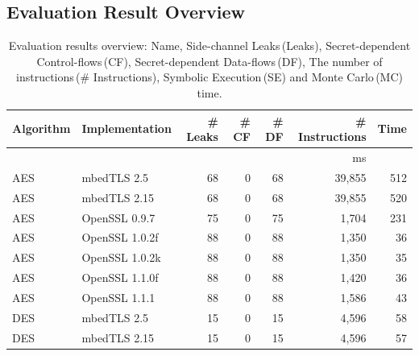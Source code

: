 \subsection{Evaluation Result Overview}
\begin{table}[]
  \centering\small\footnotesize
  \caption{Evaluation results overview: Name, Side-channel Leaks\,(Leaks), 
      Secret-dependent Control-flows\,(CF), Secret-dependent Data-flows\,(DF),
      The number of instructions\,(\# Instructions), Symbolic Execution\,(SE) and Monte Carlo\,(MC) time.
  }\label{table:over_result}
  \newlength{\x}
  \newlength{\y}
  \settowidth{\x}{~~}
  \settowidth{\y}{m}
  \addtolength{\x}{-1\y}
  \newcommand{\foo}{\mbox{\hspace*{\the\x}}}
  \begin{tabular}{llrrrrr}
      \hline
      \textbf{Algorithm} & \textbf{Implementation}  & \textbf{\# Leaks} & \textbf{\# CF}         & \textbf{\# DF}
                         & \textbf{\# Instructions}    & \textbf{Time}     \\\hline
                                               &                        &                     &                      &              & ms                     \\\cline{7-7}
      AES &  mbedTLS 2.5   & 68         & 0            & 68           & 39,855        & 512     \\
      AES &  mbedTLS 2.15   & 68        & 0            & 68           & 39,855       & 520         \\
      AES &  OpenSSL 0.9.7        & 75                 & 0                   & 75                   & 1,704        & 231       \\
      AES &  OpenSSL 1.0.2f       & 88         & 0              & 88                   & 1,350        & 36     \\
      AES&   OpenSSL 1.0.2k       & 88         & 0                   & 88                   & 1,350        & 35   \\
      AES &  OpenSSL 1.1.0f     & 88           & 0                   & 88                   & 1,420        & 36    \\
      AES & OpenSSL 1.1.1      & 88          & 0                   & 88                   & 1,586        & 43      \\
      DES &  mbedTLS 2.5     & 15                     & 0                   & 15                   & 4,596        & 58     \\
      DES &  mbedTLS 2.15           & 15                     & 0                   & 15                   & 4,596        & 57      \\

\end{tabular}
\end{table}

